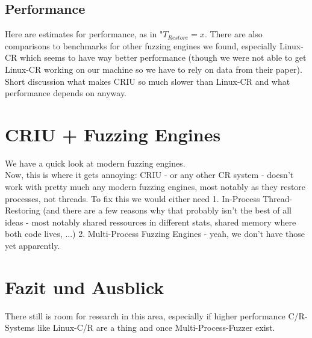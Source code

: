 \documentclass[a4paper]{article}
\begin{document}
\subsection{Performance}
Here are estimates for performance, as in "$T_{Restore} = x$. There are also comparisons to benchmarks for other fuzzing engines we found, especially Linux-CR which seems to have way better performance (though we were not able to get Linux-CR working on our machine so we have to rely on data from their paper). Short discussion what makes CRIU so much slower than Linux-CR and what performance depends on anyway.


\section{CRIU + Fuzzing Engines}
We have a quick look at modern fuzzing engines.\\
Now, this is where it gets annoying: CRIU - or any other CR system - doesn't work with pretty much any modern fuzzing engines, most notably as they restore processes, not threads. To fix this we would either need 1. In-Process Thread-Restoring (and there are a few reasons why that probably isn't the best of all ideas - most notably shared ressources in different stats, shared memory where both code lives, ...) 2. Multi-Process Fuzzing Engines - yeah, we don't have those yet apparently.

\section{Fazit und Ausblick}
There still is room for research in this area, especially if higher performance C/R-Systems like Linux-C/R are a thing and once Multi-Process-Fuzzer exist.
\end{document}
